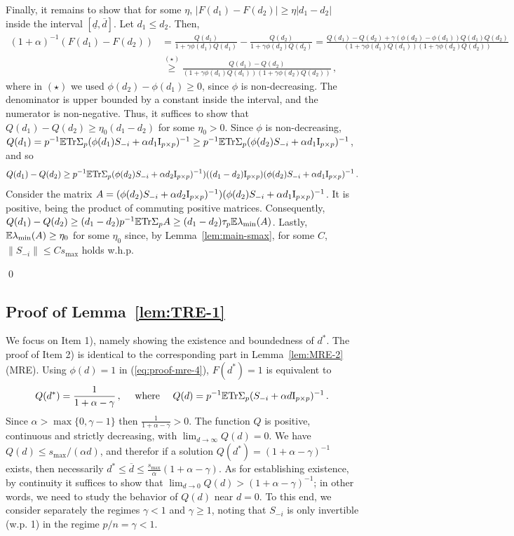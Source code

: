 \documentclass[times,sort&compress,3p]{elsarticle}
\begin{document}
Finally, it remains to show that for some $\eta$, $|F(d_1)-F(d_2)|\ge \eta|d_1-d_2|$ inside the interval $[\underline{d},\overline{d}]$. Let $d_1\le d_2$. 
Then,
\begin{align*}
    (1+\alpha)^{-1}(F(d_1)-F(d_2)) 
    &= \frac{Q(d_1)}{1+\gamma \phi(d_1)Q(d_1)} - \frac{Q(d_2)}{1+\gamma \phi(d_2)Q(d_2)} 
    = \frac{Q(d_1)-Q(d_2)+\gamma (\phi(d_2)-\phi(d_1))Q(d_1)Q(d_2)}{(1+\gamma \phi(d_1)Q(d_1))(1+\gamma \phi(d_2)Q(d_2))} \\
    &\overset{(\star)}{\ge} \frac{Q(d_1)-Q(d_2)}{(1+\gamma \phi(d_1)Q(d_1))(1+\gamma \phi(d_2)Q(d_2))}\,,
\end{align*}
where in $(\star)$ we used $\phi(d_2)-\phi(d_1)\ge 0$, since $\phi$ is non-decreasing. The denominator is upper bounded by a constant inside the interval,
and the numerator is non-negative. Thus, it suffices to show that $Q(d_1)-Q(d_2)\ge \eta_0(d_1-d_2)$ for some $\eta_0>0$. Since $\phi$ is non-decreasing,
$
Q(d_1) = p^{-1}{\mathbb{E}}\textrm{Tr}\Sigma_p(\phi(d_1)S_{-i}+\alpha d_1\mathrm{I}_{p \times p})^{-1} \ge p^{-1}{\mathbb{E}} \textrm{Tr}\Sigma_p(\phi(d_2)S_{-i}+\alpha d_1\mathrm{I}_{p \times p})^{-1}
$,
and so
\[
Q(d_1)-Q(d_2) \ge p^{-1}{\mathbb{E}}\textrm{Tr}\Sigma_p (\phi(d_2)S_{-i}+\alpha d_2\mathrm{I}_{p \times p})^{-1})( (d_1-d_2)\mathrm{I}_{p \times p} ) (\phi(d_2)S_{-i}+\alpha d_1\mathrm{I}_{p \times p})^{-1} \,.
\]
Consider the matrix $A=(\phi(d_2)S_{-i}+\alpha d_2\mathrm{I}_{p \times p})^{-1})(\phi(d_2)S_{-i}+\alpha d_1\mathrm{I}_{p \times p})^{-1}$. It is positive, being the product of {commuting} positive matrices. Consequently, $Q(d_1)-Q(d_2)\ge (d_1-d_2)p^{-1}{\mathbb{E}} \textrm{Tr} \Sigma_p A \ge (d_1-d_2)\tau_p {\mathbb{E}}\lambda_{\min}(A)$. Lastly, ${\mathbb{E}}\lambda_{\min}(A)\ge \eta_0$ for some $\eta_0$ since, by Lemma~\ref{lem:main-smax}, for some $C$, $\|S_{-i}\|\le Cs_{\max}$ holds w.h.p.

\qed


\subsection{Proof of Lemma~\ref{lem:TRE-1}}
\label{sec:proof-lem:TRE-1}

We focus on Item 1), namely showing the existence and boundedness of $d^*$. The proof of Item 2) is identical to the corresponding part in Lemma~\ref{lem:MRE-2} (MRE).
Using $\phi(d)=1$ in (\ref{eq:proof-mre-4}), $F(d^*)=1$ is equivalent to 
\begin{equation}\label{eq:TRE-proof-1}
    Q(d^*) = \frac{1}{1+\alpha-\gamma} \,,\quad \textrm{ where }\quad Q(d)=p^{-1}{\mathbb{E}}\textrm{Tr} \Sigma_p(S_{-i}+\alpha d \mathrm{I}_{p \times p})^{-1} \,.
\end{equation}
Since $\alpha>\max\{0,\gamma-1\}$ then $\frac{1}{1+\alpha-\gamma}>0$. 
The function $Q$ is positive, continuous and strictly decreasing, with $\lim_{d\to\infty} Q(d)=0$. 
We have $Q(d)\le s_{\max}/(\alpha d)$, and therefor if a solution $Q(d^*)=(1+\alpha-\gamma)^{-1}$ exists, then necessarily $d^* \le \overline{d} \le \frac{s_{\max}}{\alpha}(1+\alpha-\gamma)$. As for establishing existence, by continuity it suffices to show that $\lim_{d\to0} Q(d)>(1+\alpha-\gamma)^{-1}$; in other words, we need to study the behavior of $Q(d)$ near $d=0$. To this end, we consider separately the regimes $\gamma<1$ and $\gamma\ge 1$, noting that $S_{-i}$ is only invertible (w.p. 1) in the regime $p/n=\gamma<1$. 
\end{document}

